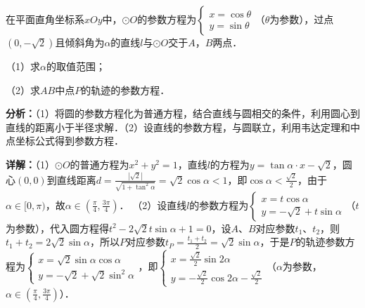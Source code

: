 \begin{question}[points=10]
在平面直角坐标系$xOy$中，$\odot O$的参数方程为$\begin{cases}x=\cos\theta\\ y=\sin\theta\end{cases}$（$\theta$为参数），过点$(0,-\sqrt{2})$且倾斜角为$\alpha$的直线$l$与$\odot O$交于$A$，$B$两点．

（1）求$\alpha$的取值范围；

（2）求$AB$中点$P$的轨迹的参数方程．
\begin{solution}

\textbf{分析：}（1）将圆的参数方程化为普通方程，结合直线与圆相交的条件，利用圆心到直线的距离小于半径求解．（2）设直线的参数方程，与圆联立，利用韦达定理和中点坐标公式得到参数方程．

\textbf{详解：}（1）$\odot O$的普通方程为$x^2+y^2=1$，直线$l$的方程为$y=\tan\alpha\cdot x-\sqrt{2}$，圆心$(0,0)$到直线距离$d=\frac{|\sqrt{2}|}{\sqrt{1+\tan^2\alpha}}=\sqrt{2}\cos\alpha<1$，即$\cos\alpha<\frac{\sqrt{2}}{2}$，由于$\alpha\in[0,\pi)$，故$\alpha\in(\frac{\pi}{4},\frac{3\pi}{4})$．
（2）设直线$l$的参数方程为$\begin{cases}x=t\cos\alpha\\ y=-\sqrt{2}+t\sin\alpha\end{cases}$（$t$为参数），代入圆方程得$t^2-2\sqrt{2}t\sin\alpha+1=0$，设$A$、$B$对应参数$t_1$、$t_2$，则$t_1+t_2=2\sqrt{2}\sin\alpha$，所以$P$对应参数$t_P=\frac{t_1+t_2}{2}=\sqrt{2}\sin\alpha$，于是$P$的轨迹参数方程为$\begin{cases}x=\sqrt{2}\sin\alpha\cos\alpha\\ y=-\sqrt{2}+\sqrt{2}\sin^2\alpha\end{cases}$，即$\begin{cases}x=\frac{\sqrt{2}}{2}\sin2\alpha\\ y=-\frac{\sqrt{2}}{2}\cos2\alpha-\frac{\sqrt{2}}{2}\end{cases}$（$\alpha$为参数，$\alpha\in(\frac{\pi}{4},\frac{3\pi}{4})$）．
\end{solution}
\end{question}

